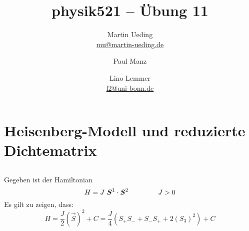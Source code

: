 

\title{physik521 – Übung 11}
\author{
	Martin Ueding \\ \small{\href{mailto:mu@martin-ueding.de}{mu@martin-ueding.de}}
        \and Paul Manz
        \and Lino Lemmer \\ \small{\href{mailto:l2@uni-bonn.de}{l2@uni-bonn.de}}
}

\pagestyle{plain}

\newcommand\kB{k_\text B}
\newcommand\muB{\mu_\text B}



\maketitle

\section{}

\fehlt
\section{}


\fehlt
\section{Heisenberg-Modell und reduzierte Dichtematrix}
\subsection{}
Gegeben ist der Hamiltonian
\[H = J \ \vec{S}^1 \cdot \vec{S}^2 \hspace{1.5cm} J>0 \]
Es gilt zu zeigen, dass:
\[H= \frac{J}{2}(\vec{S})^2 + C = \frac{J}{4}(S_+S_-+S_-S_++2(S_3)^2)+C\]

